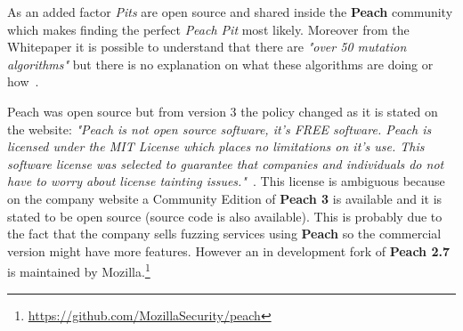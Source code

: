 \documentclass[../main.tex]{subfiles}
\begin{document}
As an added factor \textit{Pits} are open source and shared inside the \textbf{Peach} community which makes finding the perfect \textit{Peach Pit} most likely. Moreover from the Whitepaper it is possible to understand that there are \textit{"over 50 mutation algorithms"} but there is no explanation on what these algorithms are doing or how~\cite{peach}.

Peach was open source but from version 3 the policy changed as it is stated on the website: \textit{"Peach is not open source software, it’s FREE software. Peach is licensed under the MIT License which places no limitations on it’s use. This software license was selected to guarantee that companies and individuals do not have to worry about license tainting issues."}~\cite{peachlicense}. This license is ambiguous because on the company website a Community Edition of \textbf{Peach 3} is available and it is stated to be open source (source code is also available). This is probably due to the fact that the company sells fuzzing services using \textbf{Peach} so the commercial version might have more features. However an in development fork of \textbf{Peach 2.7} is maintained by Mozilla.\footnote{\url{https://github.com/MozillaSecurity/peach}}
\end{document}

